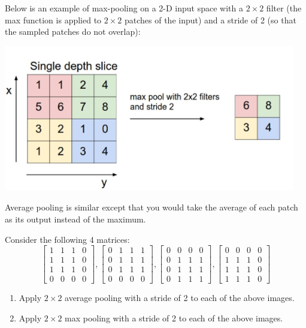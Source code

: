 Below is an example of max-pooling on a 2-D input space with a $2\times 2$ filter (the max function is applied to $2\times 2$ patches of the input) and a stride of 2 (so that the sampled patches do not overlap):

\begin{center}
  \includegraphics[width=.49\textwidth]{Plots/MaxPool.png}
\end{center}

Average pooling is similar except that you would take the average of each patch as its output instead of the maximum.

Consider the following 4 matrices:
$$
\begin{bmatrix}
    1 & 1 & 1 & 0 \\
    1 & 1 & 1 & 0 \\
    1 & 1 & 1 & 0 \\
    0 & 0 & 0 & 0
\end{bmatrix},
%
\begin{bmatrix}
    0 & 1 & 1 & 1 \\
    0 & 1 & 1 & 1 \\
    0 & 1 & 1 & 1 \\
    0 & 0 & 0 & 0
\end{bmatrix},
%
\begin{bmatrix}
	0 & 0 & 0 & 0 \\
    0 & 1 & 1 & 1 \\
    0 & 1 & 1 & 1 \\
    0 & 1 & 1 & 1
\end{bmatrix},
%
\begin{bmatrix}
    0 & 0 & 0 & 0 \\
    1 & 1 & 1 & 0 \\
    1 & 1 & 1 & 0 \\
    1 & 1 & 1 & 0
\end{bmatrix}
$$
\problem[3]

\begin{enumerate}
    \item Apply $2 \times 2$ average pooling with a stride of 2 to each of the above images.
    \item Apply $2 \times 2$ max pooling with a stride of 2 to each of the above images.
\end{enumerate}

